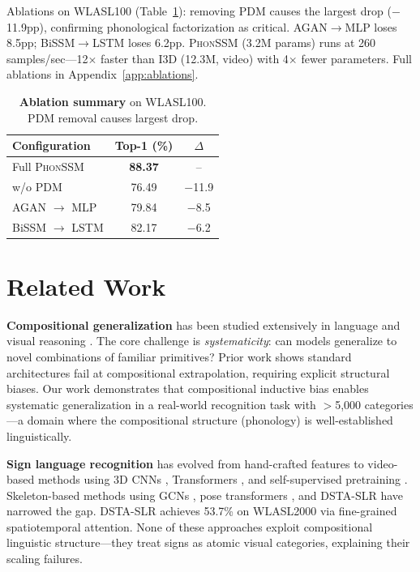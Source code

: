 \documentclass[sigconf,nonacm,anonymous]{acmart}
\theoremstyle{definition}
\theoremstyle{remark}
\newcommand{\phonssm}{\textsc{PhonSSM}}
\begin{document}
Ablations on WLASL100 (Table~\ref{tab:analysis}): removing PDM causes the largest drop ($-$11.9pp), confirming phonological factorization as critical. AGAN$\to$MLP loses 8.5pp; BiSSM$\to$LSTM loses 6.2pp. \phonssm{} (3.2M params) runs at 260 samples/sec---12$\times$ faster than I3D (12.3M, video) with 4$\times$ fewer parameters. Full ablations in Appendix~\ref{app:ablations}.

\begin{table}[H]
\caption{\textbf{Ablation summary} on WLASL100. PDM removal causes largest drop.}
\label{tab:analysis}
\begin{center}
\small
\begin{tabular}{lcc}
\toprule
Configuration & Top-1 (\%) & $\Delta$ \\
\midrule
Full \phonssm{} & \textbf{88.37} & -- \\
w/o PDM & 76.49 & $-$11.9 \\
AGAN $\rightarrow$ MLP & 79.84 & $-$8.5 \\
BiSSM $\rightarrow$ LSTM & 82.17 & $-$6.2 \\
\bottomrule
\end{tabular}
\end{center}
\end{table}

\FloatBarrier
\section{Related Work}

\textbf{Compositional generalization} has been studied extensively in language \cite{lake2018generalization, keysers2020measuring} and visual reasoning \cite{bahdanau2019systematic}. The core challenge is \textit{systematicity}: can models generalize to novel combinations of familiar primitives? Prior work shows standard architectures fail at compositional extrapolation, requiring explicit structural biases. Our work demonstrates that compositional inductive bias enables systematic generalization in a real-world recognition task with $>$5,000 categories---a domain where the compositional structure (phonology) is well-established linguistically.

\textbf{Sign language recognition} has evolved from hand-crafted features \cite{cooper2011sign} to video-based methods using 3D CNNs \cite{carreira2017quo, feichtenhofer2019slowfast, lin2019tsm}, Transformers \cite{camgoz2020sign}, and self-supervised pretraining \cite{hu2021signbert}. Skeleton-based methods using GCNs \cite{yan2018spatial, li2020word, shi2019two, duan2022pyskl}, pose transformers \cite{bohacek2022spoter}, and DSTA-SLR \cite{hu2024dsta} have narrowed the gap. DSTA-SLR achieves 53.7\% on WLASL2000 via fine-grained spatiotemporal attention. None of these approaches exploit compositional linguistic structure---they treat signs as atomic visual categories, explaining their scaling failures.
\end{document}
